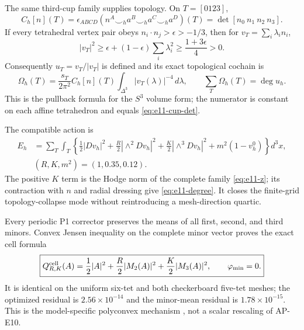 The same third-cup family supplies topology.  On $T=[0123]$,
\begin{equation}
 C_h[n](T)=\epsilon_{ABCD}
 (n^A\smile_h a^B\smile_h a^C\smile_h a^D)(T)
 =\det[n_0\ n_1\ n_2\ n_3].
 \label{eq:e11-cup-det}
\end{equation}
If every tetrahedral vertex pair obeys $n_i\cdot n_j>\epsilon>-1/3$, then
for $v_T=\sum_i\lambda_i n_i$,
\begin{equation}
 |v_T|^2\ge\epsilon+(1-\epsilon)\sum_i\lambda_i^2
 \ge\frac{1+3\epsilon}{4}>0.
 \label{eq:e11-gap}
\end{equation}
Consequently $u_T=v_T/|v_T|$ is defined and its exact topological cochain is
\begin{equation}
 \Omega_h(T)=\frac{s_T}{2\pi^2}C_h[n](T)
 \int_{\Delta^3}|v_T(\lambda)|^{-4}\,d\lambda,\qquad
 \sum_T\Omega_h(T)=\deg u_h.
 \label{eq:e11-degree}
\end{equation}
This is the pullback formula for the $S^3$ volume form; the numerator is
constant on each affine tetrahedron and equals \eqref{eq:e11-cup-det}.

The compatible action is
\begin{equation}
 \begin{split}
 E_h&=\sum_T\int_T\left\{
 \frac12|Dv_h|^2+\frac R2|\wedge^2Dv_h|^2
 +\frac K2|\wedge^3Dv_h|^2+m^2(1-v_h^0)\right\}d^3x,\\
 &(R,K,m^2)=(1,0.35,0.12).
 \end{split}
 \label{eq:e11-action}
\end{equation}
The positive $K$ term is the Hodge norm of the complete family
\eqref{eq:e11-z}; its contraction with $n$ and radial dressing give
\eqref{eq:e11-degree}.  It closes the finite-grid topology-collapse mode
without reintroducing a mesh-direction quartic.

Every periodic P1 corrector preserves the means of all first, second, and
third minors.  Convex Jensen inequality on the complete minor vector proves
the exact cell formula
\begin{equation}
 \boxed{Q_{R,K}^{\rm cell}(A)
 =\frac12|A|^2+\frac R2|M_2(A)|^2+\frac K2|M_3(A)|^2,\qquad
 \varphi_{\min}=0.}
 \label{eq:e11-cell}
\end{equation}
It is identical on the uniform six-tet and both checkerboard five-tet meshes;
the optimized residual is $2.56\times10^{-14}$ and the minor-mean residual is
$1.78\times10^{-15}$.  This is the model-specific polyconvex mechanism
\cite{Ball1977}, not a scalar rescaling of AP-E10.


